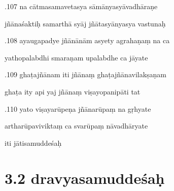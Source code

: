 \documentclass[article,12pt,a4paper]{memoir}%
\newcounter{parCount}
\begin{document}
	  
	  \pstart {}.107 na cātmasamavetasya sāmānyasyāvadhāraṇe 
	{}
	\pend%
      

	  
	  \pstart \leavevmode%
	jñānaśaktiḥ samarthā syāj jñātasyānyasya vastunaḥ 
	{}
	\pend%
      

	  
	  \pstart {}.108 ayaugapadye jñānānām asyety agrahaṇaṃ na ca 
	{}
	\pend%
      

	  
	  \pstart \leavevmode%
	yathopalabdhi smaraṇam upalabdhe ca jāyate 
	{}
	\pend%
      

	  
	  \pstart {}.109 ghaṭajñānam iti jñānaṃ ghaṭajñānavilakṣaṇam 
	{}
	\pend%
      

	  
	  \pstart \leavevmode%
	ghaṭa ity api yaj jñānaṃ viṣayopanipāti tat 
	{}
	\pend%
      

	  
	  \pstart {}.110 yato viṣayarūpeṇa jñānarūpaṃ na gṛhyate 
	{}
	\pend%
      

	  
	  \pstart \leavevmode%
	artharūpaviviktaṃ ca svarūpaṃ nāvadhāryate 
	{}
	\pend%
      

	  
	  \pstart \leavevmode%
	iti jātisamuddeśaḥ
	{}
	\pend%
      
	  
	
\chapter[{3.2 dravyasamuddeśaḥ}][{3.2 dravyasamuddeśaḥ}]{3.2 dravyasamuddeśaḥ}
\end{document}
